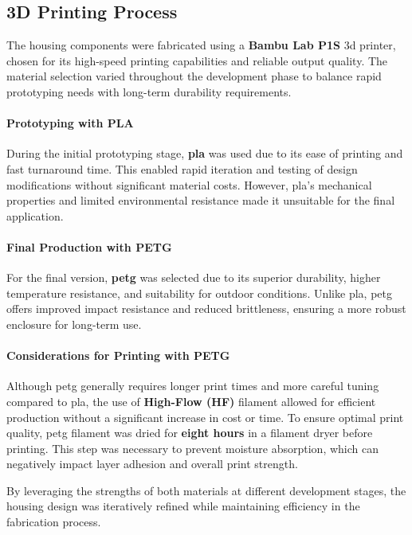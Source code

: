 \subsection{3D Printing Process}  

The housing components were fabricated using a \textbf{Bambu Lab P1S} \acrshort{3d} printer, chosen for its high-speed printing capabilities and reliable output quality. The material selection varied throughout the development phase to balance rapid prototyping needs with long-term durability requirements.  

\paragraph{Prototyping with PLA}  
During the initial prototyping stage, \textbf{\acrfull{pla}} was used due to its ease of printing and fast turnaround time. This enabled rapid iteration and testing of design modifications without significant material costs. However, \acrshort{pla}'s mechanical properties and limited environmental resistance made it unsuitable for the final application.  

\paragraph{Final Production with PETG}  
For the final version, \textbf{\acrfull{petg}} was selected due to its superior durability, higher temperature resistance, and suitability for outdoor conditions. Unlike \acrshort{pla}, \acrshort{petg} offers improved impact resistance and reduced brittleness, ensuring a more robust enclosure for long-term use.  

\paragraph{Considerations for Printing with PETG}  
Although \acrshort{petg} generally requires longer print times and more careful tuning compared to \acrshort{pla}, the use of \textbf{High-Flow (HF)} filament allowed for efficient production without a significant increase in cost or time. To ensure optimal print quality, \acrshort{petg} filament was dried for \textbf{eight hours} in a filament dryer before printing. This step was necessary to prevent moisture absorption, which can negatively impact layer adhesion and overall print strength.  

By leveraging the strengths of both materials at different development stages, the housing design was iteratively refined while maintaining efficiency in the fabrication process.

